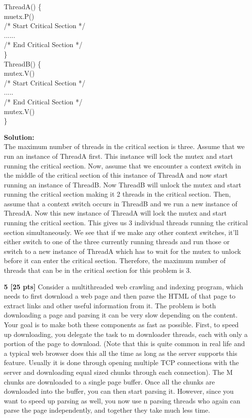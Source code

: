 \documentclass[12pt]{article}
\newcommand\tab[1][1cm]{\hspace*{#1}}
\begin{document}
\noindent ThreadA() \{\\
\tab muetx.P()\\
\tab /* Start Critical Section */\\
\tab ......\\
\tab /* End Critical Section */\\
\}\\

\noindent ThreadB() \{ \\
\tab mutex.V() \\
\tab /* Start Critical Section */\\
\tab .....\\
\tab /* End Critical Section */ \\
\tab mutex.V()\\
\}

{\bf Solution:}\\

The maximum number of threads in the critical section is three. Assume that we run an instance of ThreadA first. This instance will lock the mutex and start running the critical section. Now, assume that we encounter a context switch in the middle of the critical section of this instance of ThreadA and now start running an instance of ThreadB. Now ThreadB will unlock the mutex and start running the critical section making it 2 threads in the critical section. Then, assume that a context switch occurs in ThreadB and we run a new instance of ThreadA. Now this new instance of ThreadA will lock the mutex and start running the critical section. This gives us 3 individual threads running the critical section simultaneously. We see that if we make any other context switches, it'll either switch to one of the three currently running threads and run those or switch to a new instance of ThreadA which has to wait for the mutex to unlock before it can enter the critical section. Therefore, the maximum number of threads that can be in the critical section for this problem is 3. 

{\bf 5 [25 pts]} Consider a multithreaded web crawling and indexing program, which needs to first download a web page and then parse the HTML of that page to extract links and other useful information from it. The problem is both downloading a page and parsing it can be very slow depending on the content. Your goal is to make both these components as fast as possible. First, to speed up downloading, you delegate the task to m downloader threads, each with only a portion of the page to download. (Note that this is quite common in real life and a typical web browser does this all the time as long as the server supports this feature. Usually it is done through opening multiple TCP connections with the server and downloading equal sized chunks through each connection). The M chunks are downloaded to a single page buffer. Once all the chunks are downloaded into the buffer, you can then start parsing it. However, since you want to speed up parsing as well, you now use n parsing threads who again can parse the page independently, and together they take much less time.   
\end{document}
